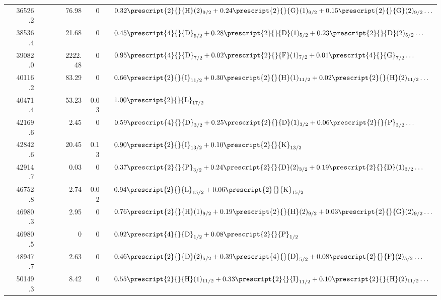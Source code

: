 \begin{tabular}{|rrr|rrrrr|l|}
   & 36526.2 &  &  &  & 76.98 & 0 &  &
  $0.32 \prescript{2}{}{\mathrm{H}}(2)_{9/2} + 0.24 \prescript{2}{}{\mathrm{G}}(1)_{9/2} + 0.15 \prescript{2}{}{\mathrm{G}}(2)_{9/2} \ldots$ \\
   & 38536.4 &  &  &  & 21.68 & 0 &  &
  $0.45 \prescript{4}{}{\mathrm{D}}_{5/2} + 0.28 \prescript{2}{}{\mathrm{D}}(1)_{5/2} + 0.23 \prescript{2}{}{\mathrm{D}}(2)_{5/2} \ldots$ \\
   & 39082.0 &  &  &  & 2222.48 & 0 &  &
  $0.95 \prescript{4}{}{\mathrm{D}}_{7/2} + 0.02 \prescript{2}{}{\mathrm{F}}(1)_{7/2} + 0.01 \prescript{4}{}{\mathrm{G}}_{7/2} \ldots$ \\
   & 40116.2 &  &  &  & 83.29 & 0 &  &
  $0.66 \prescript{2}{}{\mathrm{I}}_{11/2} + 0.30 \prescript{2}{}{\mathrm{H}}(1)_{11/2} + 0.02 \prescript{2}{}{\mathrm{H}}(2)_{11/2} \ldots$ \\
   & 40471.4 &  &  &  & 53.23 & 0.03 &  &
  $1.00 \prescript{2}{}{\mathrm{L}}_{17/2}$ \\
   & 42169.6 &  &  &  & 2.45 & 0 &  &
  $0.59 \prescript{4}{}{\mathrm{D}}_{3/2} + 0.25 \prescript{2}{}{\mathrm{D}}(1)_{3/2} + 0.06 \prescript{2}{}{\mathrm{P}}_{3/2} \ldots$ \\
   & 42842.6 &  &  &  & 20.45 & 0.13 &  &
  $0.90 \prescript{2}{}{\mathrm{I}}_{13/2} + 0.10 \prescript{2}{}{\mathrm{K}}_{13/2}$ \\
   & 42914.7 &  &  &  & 0.03 & 0 &  &
  $0.37 \prescript{2}{}{\mathrm{P}}_{3/2} + 0.24 \prescript{2}{}{\mathrm{D}}(2)_{3/2} + 0.19 \prescript{2}{}{\mathrm{D}}(1)_{3/2} \ldots$ \\
   & 46752.8 &  &  &  & 2.74 & 0.02 &  &
  $0.94 \prescript{2}{}{\mathrm{L}}_{15/2} + 0.06 \prescript{2}{}{\mathrm{K}}_{15/2}$ \\
   & 46980.3 &  &  &  & 2.95 & 0 &  &
  $0.76 \prescript{2}{}{\mathrm{H}}(1)_{9/2} + 0.19 \prescript{2}{}{\mathrm{H}}(2)_{9/2} + 0.03 \prescript{2}{}{\mathrm{G}}(2)_{9/2} \ldots$ \\
   & 46980.5 &  &  &  & 0 & 0 &  &
  $0.92 \prescript{4}{}{\mathrm{D}}_{1/2} + 0.08 \prescript{2}{}{\mathrm{P}}_{1/2}$ \\
   & 48947.7 &  &  &  & 2.63 & 0 &  &
  $0.46 \prescript{2}{}{\mathrm{D}}(2)_{5/2} + 0.39 \prescript{4}{}{\mathrm{D}}_{5/2} + 0.08 \prescript{2}{}{\mathrm{F}}(2)_{5/2} \ldots$ \\
   & 50149.3 &  &  &  & 8.42 & 0 &  &
  $0.55 \prescript{2}{}{\mathrm{H}}(1)_{11/2} + 0.33 \prescript{2}{}{\mathrm{I}}_{11/2} + 0.10 \prescript{2}{}{\mathrm{H}}(2)_{11/2} \ldots$ \\

\end{tabular}

